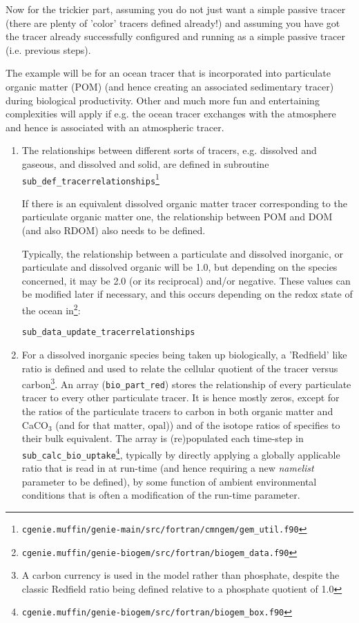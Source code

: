 \documentclass[11pt,fleqn]{book} %
\begin{document}
Now for the trickier part, assuming you do not just want a simple passive tracer (there are plenty of 'color' tracers defined already!) and assuming you have got the tracer already successfully configured and running as a simple passive tracer (i.e. previous steps).

\indent The example will be for an ocean tracer that is incorporated into particulate organic matter (POM) (and hence creating an associated sedimentary tracer) during biological productivity.
Other and much more fun and entertaining complexities will apply if e.g. the ocean tracer exchanges with the atmosphere and hence is associated with an atmospheric tracer.
\begin{enumerate}
\item 
The relationships between different sorts of tracers, e.g. dissolved and gaseous, and dissolved and solid, are defined in subroutine \texttt{sub\_def\_tracerrelationships}\footnote{\texttt{cgenie.muffin/genie-main/src/fortran/cmngem/gem\_util.f90}}

If there is an equivalent dissolved organic matter tracer corresponding to the particulate organic matter one, the relationship between POM and DOM (and also RDOM) also needs to be defined.

Typically, the relationship between a particulate and dissolved inorganic, or particulate and dissolved organic will be 1.0, but depending on the species concerned, it may be 2.0 (or its reciprocal) and/or negative. These values can be modified later if necessary, and this occurs depending on the redox state of the ocean in\footnote{\texttt{cgenie.muffin/genie-biogem/src/fortran/biogem\_data.f90}}:
\vspace{-1mm}\small\begin{verbatim}
sub_data_update_tracerrelationships
\end{verbatim}\vspace{-1mm}\normalsize

\item 
For a dissolved inorganic species being taken up biologically, a 'Redfield' like ratio is defined and used to relate the cellular quotient of the tracer versus carbon\footnote{A carbon currency is used in the model rather than phosphate, despite the classic Redfield ratio being defined relative to a phosphate quotient of 1.0}. An array (\texttt{bio\_part\_red}) stores the relationship of every particulate tracer to every other particulate tracer. It is hence mostly zeros, except for the ratios of the particulate tracers to carbon in both organic matter and CaCO\(_{3}\) (and for that matter, opal)) and of the isotope ratios of specifies to their bulk equivalent. The array is (re)populated each time-step in \texttt{sub\_calc\_bio\_uptake}\footnote{\texttt{cgenie.muffin/genie-biogem/src/fortran/biogem\_box.f90}},  typically by directly applying a  globally applicable ratio that is read in at run-time (and hence requiring a new \textit{namelist} parameter to be defined), by some function of ambient environmental conditions that  is often a modification of the run-time parameter.    

\end{enumerate}
\end{document}
